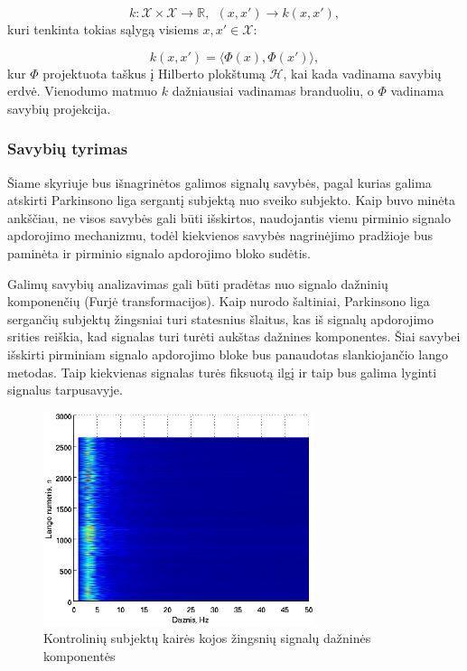 \documentclass[]{vgtuef}
\begin{document}
\begin{equation}
  k: \mathcal{X} \times \mathcal{X} \rightarrow \mathbb{R}, ~~ (x,x')
  \rightarrow k(x,x'),
\end{equation}
kuri tenkinta tokias sąlygą visiems $x,x' \in \mathcal{X}$:

\begin{equation}
  k(x,x') = \langle \Phi(x), \Phi(x') \rangle,
\end{equation}
kur $\Phi$ projektuota taškus į Hilberto plokštumą $\mathcal{H}$,
kai kada vadinama savybių erdvė. Vienodumo matmuo $k$ dažniausiai
vadinamas branduoliu, o $\Phi$ vadinama savybių projekcija.

\subsubsection{Savybių tyrimas}

Šiame skyriuje bus išnagrinėtos galimos signalų savybės, pagal kurias
galima atskirti Parkinsono liga sergantį subjektą nuo sveiko
subjekto. Kaip buvo minėta ankščiau, ne visos savybės gali būti
išskirtos, naudojantis vienu pirminio signalo apdorojimo mechanizmu,
todėl kiekvienos savybės nagrinėjimo pradžioje bus paminėta ir
pirminio signalo apdorojimo bloko sudėtis.

Galimų savybių analizavimas gali būti pradėtas nuo signalo dažninių
komponenčių (Furjė transformacijos). Kaip nurodo šaltiniai, %
Parkinsono liga sergančių subjektų žingsniai turi statesnius šlaitus,
kas iš signalų apdorojimo srities reiškia, kad signalas turi turėti
aukštas dažnines komponentes. Šiai savybei išskirti pirminiam signalo
apdorojimo bloke bus panaudotas slankiojančio lango metodas. Taip
kiekvienas signalas turės fiksuotą ilgį ir taip bus galima lyginti
signalus tarpusavyje.

\begin{figure}[!t]
  \centering
  \includegraphics[width=300px]{figures/co_fft.eps}
  \caption{Kontrolinių subjektų kairės kojos žingsnių signalų dažninės
  komponentės}
  \label{fig:co_fft}
\end{figure}
\end{document}
